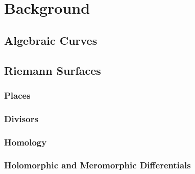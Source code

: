 \chapter{Background}\label{ch:background}

\section{Algebraic Curves}\label{sec:background-algebraic-curves}

\section{Riemann Surfaces}\label{sec:background-algebraic-curves}

\subsection{Places}\label{subsec:background-places}

\subsection{Divisors}\label{subsec:background-divisors}

\subsection{Homology}\label{subsec:background-homology}

\subsection{Holomorphic and Meromorphic
  Differentials}\label{subsec:background-holomorphic-and-meromorphic-differentials}

